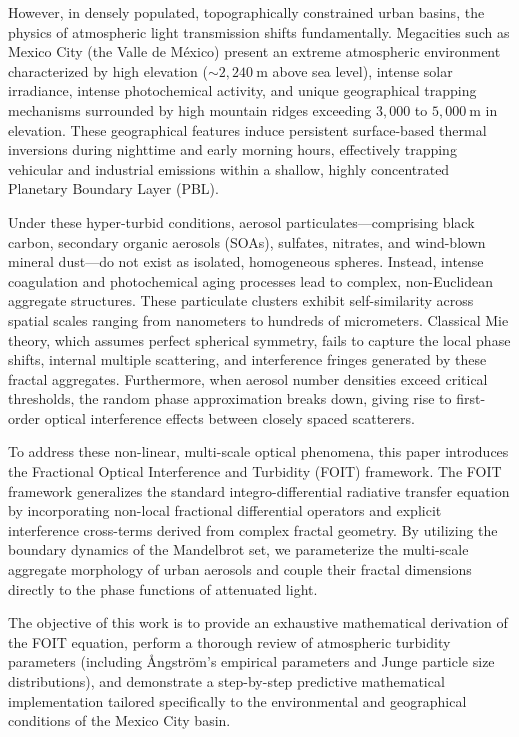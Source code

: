 \documentclass[12pt,a4paper]{article}
\begin{document}
However, in densely populated, topographically constrained urban basins, the physics of atmospheric light transmission shifts fundamentally. Megacities such as Mexico City (the Valle de México) present an extreme atmospheric environment characterized by high elevation ($\sim 2,240~\text{m}$ above sea level), intense solar irradiance, intense photochemical activity, and unique geographical trapping mechanisms surrounded by high mountain ridges exceeding $3,000$ to $5,000~\text{m}$ in elevation. These geographical features induce persistent surface-based thermal inversions during nighttime and early morning hours, effectively trapping vehicular and industrial emissions within a shallow, highly concentrated Planetary Boundary Layer (PBL).

Under these hyper-turbid conditions, aerosol particulates—comprising black carbon, secondary organic aerosols (SOAs), sulfates, nitrates, and wind-blown mineral dust—do not exist as isolated, homogeneous spheres. Instead, intense coagulation and photochemical aging processes lead to complex, non-Euclidean aggregate structures. These particulate clusters exhibit self-similarity across spatial scales ranging from nanometers to hundreds of micrometers. Classical Mie theory, which assumes perfect spherical symmetry, fails to capture the local phase shifts, internal multiple scattering, and interference fringes generated by these fractal aggregates. Furthermore, when aerosol number densities exceed critical thresholds, the random phase approximation breaks down, giving rise to first-order optical interference effects between closely spaced scatterers.

To address these non-linear, multi-scale optical phenomena, this paper introduces the Fractional Optical Interference and Turbidity (FOIT) framework. The FOIT framework generalizes the standard integro-differential radiative transfer equation by incorporating non-local fractional differential operators and explicit interference cross-terms derived from complex fractal geometry. By utilizing the boundary dynamics of the Mandelbrot set, we parameterize the multi-scale aggregate morphology of urban aerosols and couple their fractal dimensions directly to the phase functions of attenuated light.

The objective of this work is to provide an exhaustive mathematical derivation of the FOIT equation, perform a thorough review of atmospheric turbidity parameters (including Ångström's empirical parameters and Junge particle size distributions), and demonstrate a step-by-step predictive mathematical implementation tailored specifically to the environmental and geographical conditions of the Mexico City basin.
\end{document}
